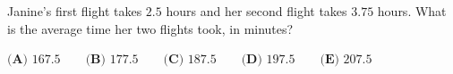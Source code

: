 Janine's first flight takes $2.5$ hours and her second flight takes $3.75$ hours. What is the average time her two flights took, in minutes?

$\textbf{(A) }167.5\qquad\textbf{(B) }177.5\qquad\textbf{(C) }187.5\qquad\textbf{(D) }197.5\qquad\textbf{(E) }207.5$
